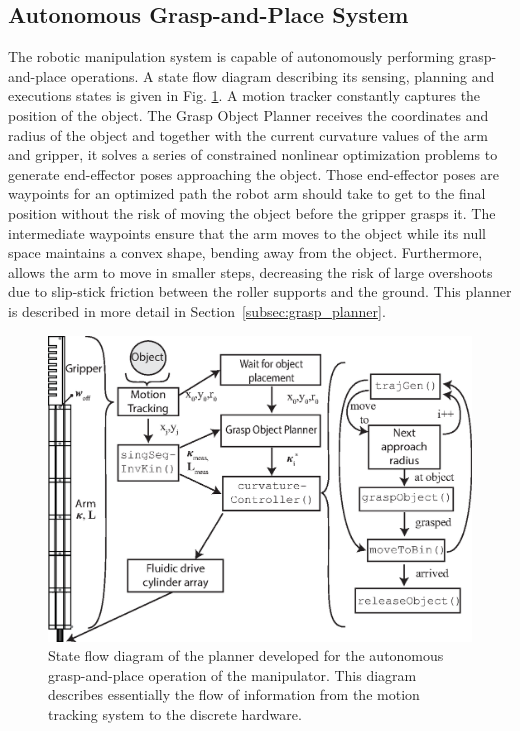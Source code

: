 \subsection{Autonomous Grasp-and-Place System}
\label{subsec:grasp-place-planner}
The robotic manipulation system is capable of autonomously performing grasp-and-place operations. 
A state flow diagram describing its sensing, planning and executions states is given in Fig. \ref{fig:grasp-and-place-planner}. 
A motion tracker constantly captures the position of the object.
The Grasp Object Planner receives the coordinates and radius of the object and together with the current curvature values of the arm and gripper, it solves a series of constrained nonlinear optimization problems to generate end-effector poses approaching the object.
Those end-effector poses are waypoints for an optimized path the robot arm should take to get to the final position without the risk of moving the object before the gripper grasps it. 
The intermediate waypoints ensure that the arm moves to the object while its null space maintains a convex shape,  bending away from the object. 
Furthermore,  allows the arm to move in smaller steps, decreasing the risk of large overshoots due to slip-stick friction between the roller supports and the ground.
This planner is described in more detail in Section~\ref{subsec:grasp_planner}.

\begin{figure}[!htb]
\centering
   \includegraphics[width=0.95\columnwidth]{Figures/processing_control/grasp_place_planner.eps}
   \caption{State flow diagram of the planner developed for the autonomous grasp-and-place operation of the manipulator. This diagram describes essentially the flow of information from the motion tracking system to the discrete hardware.}
   \label{fig:grasp-and-place-planner}
\end{figure}

